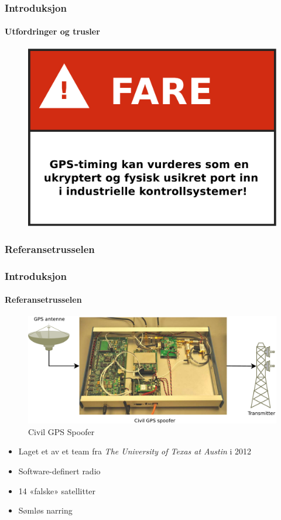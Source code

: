 \documentclass[xcolor=table]{beamer}
\begin{document}
\begin{frame}
  \frametitle{Introduksjon}
\framesubtitle{Utfordringer og trusler}
      \begin{figure}
        \includegraphics[scale=0.40]{thesis/graphics/fare.pdf}
      \end{figure} 
\end{frame}

\subsubsection{Referansetrusselen}
\begin{frame}
  \frametitle{Introduksjon}
  \framesubtitle{Referansetrusselen}
  \begin{figure}
    \includegraphics[scale=0.2]{thesis/graphics/spoofer_diagram.pdf}
    \caption{Civil GPS Spoofer \cite{EVPMUGA}}
  \end{figure}
  \begin{itemize}
  \item Laget et av et team fra \textit{The University of Texas at Austin} i 2012
  \item Software-definert radio
  \item 14 «falske» satellitter
  \item Sømløs narring
  \end{itemize}
\end{frame}
\end{document}
